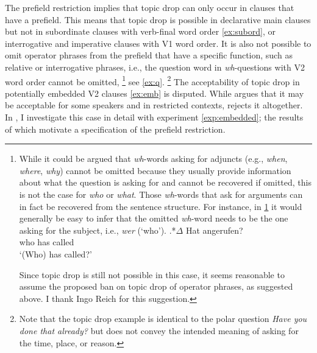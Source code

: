 The prefield restriction implies that topic drop can only occur in clauses that have a prefield.
This means that topic drop is possible in declarative main clauses but not in subordinate clauses with verb-final word order \ref{ex:subord}, or interrogative and imperative  clauses with V1 word order.
It is also not possible to omit operator phrases from the prefield that have a specific function, such as relative or interrogative phrases, i.e., the question word in \textit{wh}-questions with V2 word  order cannot be omitted,%
\footnote{
While it could be argued that \textit{wh}-words asking for adjuncts  (e.g., \textit{when}, \textit{where}, \textit{why}) cannot be omitted because they usually provide information about what the question is asking for and cannot be recovered  if omitted, this is not the case for \textit{who} or \textit{what}.
Those \textit{wh}-words that ask for arguments  can in fact be recovered from the sentence structure.
For instance, in \ref{ex:wh} it would generally be easy to infer that the omitted \textit{wh}-word needs to be the one asking for the subject, i.e., \textit{wer} (`who').
\exg.*$\Delta$ Hat angerufen?\label{ex:wh}\\
who has called\\
`(Who) has called?'

Since topic drop is still not possible in this case, it seems reasonable to assume the proposed ban on topic drop of operator phrases, as suggested above.
I thank Ingo Reich for this suggestion.
}
%
see \ref{ex:q}.%
\footnote{Note that the topic drop example is identical to the polar question \textit{Have you done that already?} but does not convey the intended meaning of asking for the time, place, or reason.}
%
The acceptability of topic drop in potentially embedded  V2 clauses \ref{ex:emb} is disputed.
While \citet{jaensch2005} argues that it may be acceptable for some speakers and in restricted contexts, \citet{cardinaletti1990} rejects it altogether.
In , I investigate this case in detail with experiment \ref*{exp:embedded}; the results of which motivate a specification of the prefield restriction.

